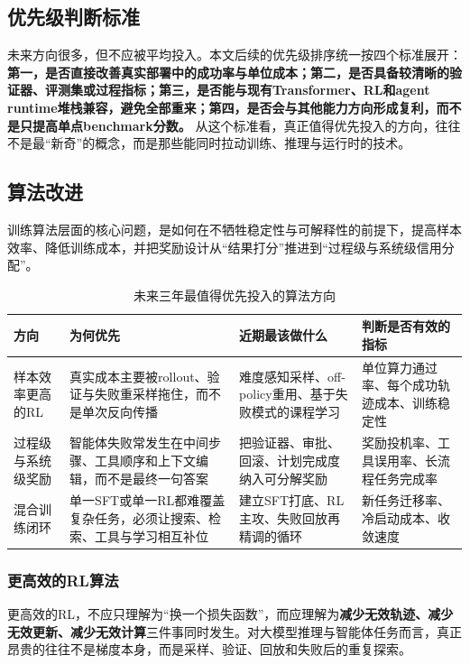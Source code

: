 \documentclass[12pt,a4paper]{article}
\begin{document}
\subsection{优先级判断标准}

未来方向很多，但不应被平均投入。本文后续的优先级排序统一按四个标准展开：\textbf{第一，是否直接改善真实部署中的成功率与单位成本；第二，是否具备较清晰的验证器、评测集或过程指标；第三，是否能与现有Transformer、RL和agent runtime堆栈兼容，避免全部重来；第四，是否会与其他能力方向形成复利，而不是只提高单点benchmark分数。} 从这个标准看，真正值得优先投入的方向，往往不是最“新奇”的概念，而是那些能同时拉动训练、推理与运行时的技术。


\subsection{算法改进}

训练算法层面的核心问题，是如何在不牺牲稳定性与可解释性的前提下，提高样本效率、降低训练成本，并把奖励设计从“结果打分”推进到“过程级与系统级信用分配”。

\begin{table}[H]
\centering
\small
\caption{未来三年最值得优先投入的算法方向}
\begin{tabular}{p{3.1cm}p{3.9cm}p{3.7cm}p{3.2cm}}
\toprule
\textbf{方向} & \textbf{为何优先} & \textbf{近期最该做什么} & \textbf{判断是否有效的指标} \\
\midrule
样本效率更高的RL & 真实成本主要被rollout、验证与失败重采样拖住，而不是单次反向传播 & 难度感知采样、off-policy重用、基于失败模式的课程学习 & 单位算力通过率、每个成功轨迹成本、训练稳定性 \\
过程级与系统级奖励 & 智能体失败常发生在中间步骤、工具顺序和上下文编辑，而不是最终一句答案 & 把验证器、审批、回滚、计划完成度纳入可分解奖励 & 奖励投机率、工具误用率、长流程任务完成率 \\
混合训练闭环 & 单一SFT或单一RL都难覆盖复杂任务，必须让搜索、检索、工具与学习相互补位 & 建立SFT打底、RL主攻、失败回放再精调的循环 & 新任务迁移率、冷启动成本、收敛速度 \\
\bottomrule
\end{tabular}
\end{table}

\subsubsection{更高效的RL算法}

更高效的RL，不应只理解为“换一个损失函数”，而应理解为\textbf{减少无效轨迹、减少无效更新、减少无效计算}三件事同时发生。对大模型推理与智能体任务而言，真正昂贵的往往不是梯度本身，而是采样、验证、回放和失败后的重复探索。
\end{document}
